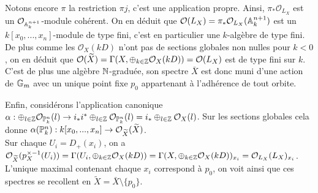 Notons encore $\pi$ la restriction $\pi j$, c'est une application propre. Ainsi, $\pi_*\mathcal{O}_{L_X}$ est un $\mathcal{O}_{\mathbb{A}_k^{n+1}}$-module cohérent. On en déduit que $\mathcal{O}(L_X)=\pi_*\mathcal{O}_{L_X}(\mathbb{A}_k^{n+1})$ est un $k[x_0,...,x_n]$-module de type fini, c'est en particulier une $k$-algèbre de type fini. De plus comme les $\mathcal{O}_X(kD)$ n'ont pas de sections globales non nulles pour $k<0$, on en déduit que $\mathcal{O}(\widetilde{X})=\Gamma(X,\oplus_{k\in \mathbb{Z}}\mathcal{O}_X(kD))=\mathcal{O}(L_X)$ est de type fini sur $k$. C'est de plus une algèbre $\mathbb{N}$-graduée, son spectre $\bar{X}$ est donc muni d'une action de $\mathbb{G}_m$ avec un unique point fixe $p_0$ appartenant à l'adhérence de tout orbite. 

Enfin, considérons l'application canonique $\alpha: \oplus_{l\in\mathbb{Z}}\mathcal{O}_{\mathbb{P}^n_k}(l)\rightarrow i_*i^*\oplus_{l\in \mathbb{Z}}\mathcal{O}_{\mathbb{P}^n_k}(l)=i_*\oplus_{l\in \mathbb{Z}}\mathcal{O}_X(l)$. Sur les sections globales cela donne $\alpha(\mathbb{P}^n_k): k[x_0,...,x_n]\rightarrow \mathcal{O}_{\widetilde{X}}(\widetilde{X})$.\\
Sur chaque $U_i=D_+(x_i)$, on a $\mathcal{O}_{\widetilde{X}}(p_X^{\times-1}(U_i))=\Gamma(U_i,\oplus_{k\in \mathbb{Z}}\mathcal{O}_X(kD))=\Gamma(X,\oplus_{k\in \mathbb{Z}}\mathcal{O}_X(kD))_{x_i}=\mathcal{O}_{L_X}(L_X)_{x_i}$. L'unique maximal contenant chaque $x_i$ correspond à $p_0$, on voit ainsi que ces spectres se recollent en $\widetilde{X}=\bar{X}\setminus \lbrace p_0 \rbrace$.\\


